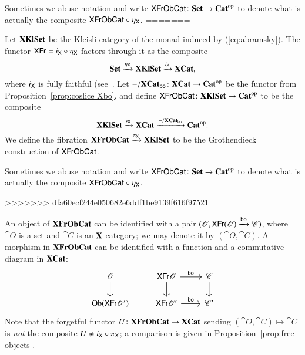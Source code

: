 \documentclass[12pt,oneside,article,draft]{memoir}
\begin{document}
\begin{enumerate}
\begin{definition}
	Sometimes we abuse notation and write $\mathsf{XFrObCat}\colon\mathbf{Set}\to{\mathbf{Cat}}^{\text{op}}$ to denote what is actually the composite $\mathsf{XFrObCat}\circ\eta_{\mathsf{X}}$.
=======

Let $\mathbf{XKlSet}$ be the Kleisli category of the monad induced by (\ref{eq:abramsky}). The functor $\mathsf{XFr}=i_{\mathsf{X}}\circ\eta_{\mathsf{X}}$ factors through it as the composite 
$$\mathbf{Set}\xrightarrow{\eta_{\mathsf{X}}}\mathbf{XKlSet}\xrightarrow{i_{\mathsf{X}}}\mathbf{XCat},$$ 
where $i_{\mathsf{X}}$ is fully faithful (see~\cite[Proposition 4.2.1]{BorceuxV2}.  Let $-/\mathbf{XCat}_{\mathsf{bo}}\colon\mathbf{XCat}\to{\mathbf{Cat}}^{\text{op}}$ be the functor from Proposition~\ref{prop:coslice Xbo}, and define $\mathsf{XFrObCat}\colon\mathbf{XKlSet}\to{\mathbf{Cat}}^{\text{op}}$ to be the composite
$$\mathbf{XKlSet}\xrightarrow{i_{\mathsf{X}}}\mathbf{XCat}\xrightarrow{-/\mathbf{XCat}_{\mathsf{bo}}}{\mathbf{Cat}}^{\text{op}}.$$
We define the fibration $\mathbf{XFrObCat}\xrightarrow{\pi_{\mathsf{X}}}\mathbf{XKlSet}$ to be the Grothendieck construction of $\mathsf{XFrObCat}$. 

Sometimes we abuse notation and write $\mathsf{XFrObCat}\colon\mathbf{Set}\to{\mathbf{Cat}}^{\text{op}}$ to denote what is actually the composite $\mathsf{XFrObCat}\circ\eta_{\mathsf{X}}$.

>>>>>>> dfa60ecf244e050682e6ddf1be9139f616f97521
\end{definition}

An object of $\mathbf{XFrObCat}$ can be identified with a pair $(\mathscr{O},\mathsf{XFr}(\mathscr{O})\xrightarrow{\mathsf{bo}}\mathscr{C})$, where $\cat{O}$ is a set and $\cat{C}$ is an $\mathbf{X}$-category; we may denote it by $(\cat{O},\cat{C})$.
A morphism in $\mathbf{XFrObCat}$ can be identified with a function and a commutative diagram in $\mathbf{XCat}$:
$$
\begin{tikzcd}
	\cat{O}\ar[d]&\Fun{XFr}\cat{O}\ar[r,"\bo"]\ar[d]&\cat{C}\ar[d]\\
	\Ob(\Fun{XFr}\cat{O'})&\Fun{XFr}\cat{O'}\ar[r,"\bo"]&\cat{C'}
\end{tikzcd}
$$
Note that the forgetful functor $U\colon\mathbf{XFrObCat}\to\mathbf{XCat}$ sending $(\cat{O},\cat{C})\mapsto\cat{C}$ is \emph{not} the composite $U\neq i_{\mathsf{X}}\circ\pi_{\mathsf{X}}$; a comparison is given in Proposition~\ref{prop:free objects}.


\end{enumerate}
\end{document}
